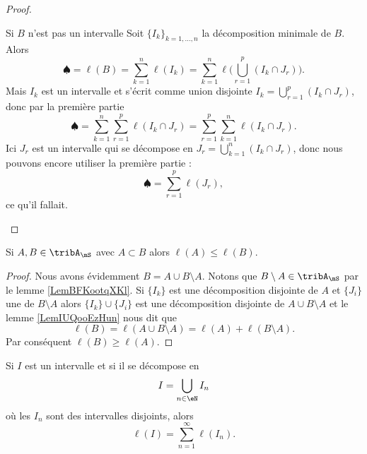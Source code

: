 \begin{proof}
\begin{subproof}
    \item[Si \( B\) n'est pas un intervalle]
        Soit \( \{ I_k \}_{k=1,\ldots, n}\) la décomposition minimale de \( B\). Alors
        \begin{equation}
            \spadesuit=\ell(B)=\sum_{k=1}^n\ell(I_k)=\sum_{k=1}^n\ell\big( \bigcup_{r=1}^p(I_k\cap J_r) \big).
        \end{equation}
        Mais \( I_k\) est un intervalle et s'écrit comme union disjointe \( I_k=\bigcup_{r=1}^p(I_k\cap J_r)\), donc par la première partie
        \begin{equation}
            \spadesuit=\sum_{k=1}^n\sum_{r=1}^p\ell(I_k\cap J_r)=\sum_{r=1}^p\sum_{k=1}^n\ell(I_k\cap J_r).
        \end{equation}
        Ici \( J_r\) est un intervalle qui se décompose en \( J_r=\bigcup_{k=1}^n(I_k\cap J_r)\), donc nous pouvons encore utiliser la première partie :
        \begin{equation}
            \spadesuit=\sum_{r=1}^p\ell(J_r),
        \end{equation}
        ce qu'il fallait.
    \end{subproof}
\end{proof}

\begin{lemma}   \label{LemPIOooRLkbo}
    Si \( A,B\in\tribA_{\mS}\) avec \( A\subset B\) alors \( \ell(A)\leq \ell(B)\).
\end{lemma}

\begin{proof}
    Nous avons évidemment \( B=A\cup B\setminus A\). Notons que \( B\setminus A\in\tribA_{\mS}\) par le lemme \ref{LemBFKootqXKl}. Si \( \{ I_k \}\) est une décomposition disjointe de \( A\) et \( \{ J_i \}\) une de \( B\setminus A\) alors \( \{ I_k \}\cup\{ J_i \}\) est une décomposition disjointe de \( A\cup B\setminus A\) et le lemme \ref{LemIUQooEzHun} nous dit que
    \begin{equation}
        \ell(B)=\ell(A\cup B\setminus A)=\ell(A)+\ell(B\setminus A).
    \end{equation}
    Par conséquent \( \ell(B)\geq \ell(A)\).
\end{proof}

\begin{lemma}   \label{LemUMVooZJgMu}
    Si \( I\) est un intervalle et si il se décompose en
    \begin{equation}
        I=\bigcup_{n\in \eN}I_n
    \end{equation}
    où les \( I_n\) sont des intervalles disjoints, alors
    \begin{equation}
        \ell(I)=\sum_{n=1}^{\infty}\ell(I_n).
    \end{equation}
\end{lemma}


